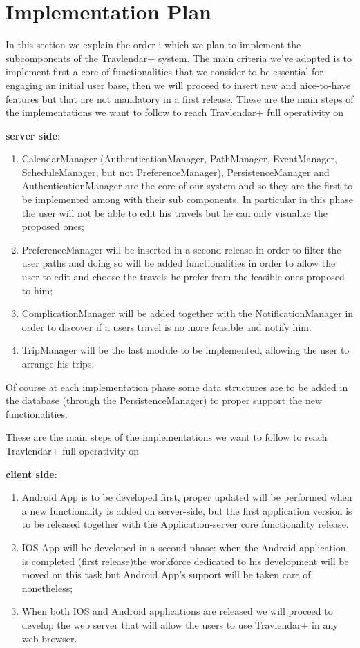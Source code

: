 \section{Implementation Plan}
In this section we explain the order i which we plan to implement the subcomponents of the Travlendar+ system.
The main criteria we've adopted is to implement first a core of functionalities that we consider to be essential for engaging an initial user base, then we will proceed to insert new and nice-to-have features but that are not mandatory in a first release.
These are the main steps of the implementations we want to follow to reach Travlendar+ full operativity on\begin{large}
\textbf{server side}:
\end{large}
\begin{enumerate}
\item CalendarManager (AuthenticationManager, PathManager, EventManager, ScheduleManager, but not PreferenceManager), PersistenceManager and AuthenticationManager are the core of our system and so they are the first to be implemented among with their sub components. In particular in this phase the user will not be able to edit his travels but he can only visualize the proposed ones;
\item PreferenceManager will be inserted in a second release in order to filter the user paths and doing so will be added functionalities in order to allow the user to edit and choose the travels he prefer from the feasible ones proposed to him;
\item ComplicationManager will be added together with the NotificationManager in order to discover if a users travel is no more feasible and notify him.
\item TripManager will be the last module to be implemented, allowing the user to arrange his trips.
\end{enumerate}
Of course at each implementation phase some data structures are to be added in the database (through the PersistenceManager) to proper support the new functionalities.

These are the main steps of the implementations we want to follow to reach Travlendar+ full operativity on\begin{large}
\textbf{client side}:
\end{large}
\begin{enumerate}
\item Android App is to be developed first, proper updated will be performed when a new functionality is added on server-side, but the first application version is to be released together with the Application-server core functionality release.
\item IOS App will be developed in a second phase: when the Android application is completed (first release)the workforce dedicated to his development will be moved on this task but Android App's support will be taken care of nonetheless;
\item When both IOS and Android applications are released we will proceed to develop the web server that will allow the users to use Travlendar+ in any web browser.
\end{enumerate}

